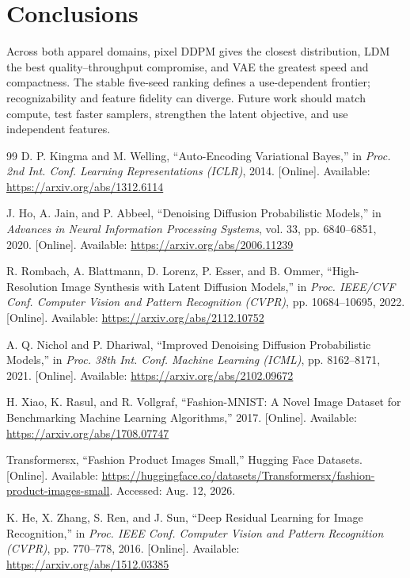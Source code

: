 \documentclass{article}
\begin{document}
\section{Conclusions}
Across both apparel domains, pixel DDPM gives the closest distribution, LDM the best quality--throughput compromise, and VAE the greatest speed and compactness. The stable five-seed ranking defines a use-dependent frontier; recognizability and feature fidelity can diverge. Future work should match compute, test faster samplers, strengthen the latent objective, and use independent features.

\clearpage
\begin{thebibliography}{99}
 D. P. Kingma and M. Welling, ``Auto-Encoding Variational Bayes,'' in \emph{Proc. 2nd Int. Conf. Learning Representations (ICLR)}, 2014. [Online]. Available: \url{https://arxiv.org/abs/1312.6114}

 J. Ho, A. Jain, and P. Abbeel, ``Denoising Diffusion Probabilistic Models,'' in \emph{Advances in Neural Information Processing Systems}, vol. 33, pp. 6840--6851, 2020. [Online]. Available: \url{https://arxiv.org/abs/2006.11239}

 R. Rombach, A. Blattmann, D. Lorenz, P. Esser, and B. Ommer, ``High-Resolution Image Synthesis with Latent Diffusion Models,'' in \emph{Proc. IEEE/CVF Conf. Computer Vision and Pattern Recognition (CVPR)}, pp. 10684--10695, 2022. [Online]. Available: \url{https://arxiv.org/abs/2112.10752}

 A. Q. Nichol and P. Dhariwal, ``Improved Denoising Diffusion Probabilistic Models,'' in \emph{Proc. 38th Int. Conf. Machine Learning (ICML)}, pp. 8162--8171, 2021. [Online]. Available: \url{https://arxiv.org/abs/2102.09672}

 H. Xiao, K. Rasul, and R. Vollgraf, ``Fashion-MNIST: A Novel Image Dataset for Benchmarking Machine Learning Algorithms,'' 2017. [Online]. Available: \url{https://arxiv.org/abs/1708.07747}

 Transformersx, ``Fashion Product Images Small,'' Hugging Face Datasets. [Online]. Available: \url{https://huggingface.co/datasets/Transformersx/fashion-product-images-small}. Accessed: Aug. 12, 2026.

 K. He, X. Zhang, S. Ren, and J. Sun, ``Deep Residual Learning for Image Recognition,'' in \emph{Proc. IEEE Conf. Computer Vision and Pattern Recognition (CVPR)}, pp. 770--778, 2016. [Online]. Available: \url{https://arxiv.org/abs/1512.03385}


\end{thebibliography}
\end{document}
